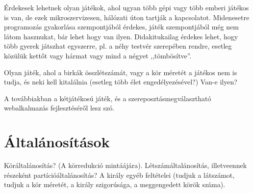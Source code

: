 \documentclass{article}
\begin{document}
	Érdekesek lehetnek olyan játékok, ahol ugyan több gépi vagy több emberi játékos is van, de ezek mikroszervizesen, hálózati úton tartják a kapcsolatot. Midenesetre programozás gyakorlása szempontjából érdekes, játék szempontjából még nem látom hasznukat, bár lehet hogy van ilyen. Didakitukailag érdekes lehet, hogy több gyerek játszhat egyszerre, pl. a néhy testvér szerepében rendre, esetleg közülük kettőt vagy hármat vagy mind a négyet ,,tömbösítve''.

	Olyan játék, ahol a birkák összlétszámát, vagy a kör méretét a játékos nem is tudja, és neki kell kitalálnia (esetleg több élet engedélyezésével?) Van-e ilyen?

	A továbbiakban a kétjátékosú játék, és a szereposztásmegválasztható webalkalmazás fejlesztéséről lesz szó.

	\section{Általánosítások}

	Köráltalánosítás? (A körredukció mintáájára). Létszámáltalánosítás, illetveennek részeként partícióáltalánosítás? A király egyéb feltételei (tudjuk a látszámot, tudjuk a kör méretét, a király szigorúsága, a meggengedett körök száma).
\end{document}
